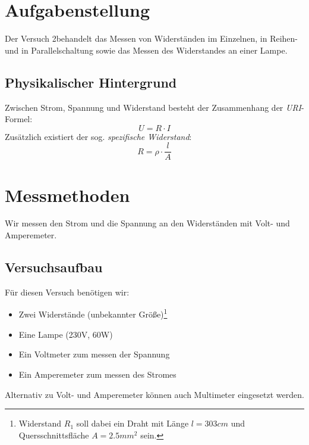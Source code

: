 \documentclass[10pt,a4paper]{article}
\newcommand{\vnr}{2}
\begin{document}
\newpage

\tableofcontents

\vspace{10pt}

\section{Aufgabenstellung}
\begin{flushleft}
Der Versuch \vnr behandelt das Messen von Widerständen im Einzelnen, in Reihen- und in Parallelschaltung sowie das Messen des Widerstandes an einer Lampe.
\end{flushleft}

\subsection{Physikalischer Hintergrund}
\begin{flushleft}
Zwischen Strom, Spannung und Widerstand besteht der Zusammenhang der \textit{URI}-Formel:
\begin{equation}\label{eq:uri}
U = R \cdot I
\end{equation}
Zusätzlich existiert der sog. \textit{spezifische Widerstand}:
\begin{equation}\label{eq:spezwi}
R = \rho \cdot \frac{l}{A}
\end{equation}
\end{flushleft}

\section{Messmethoden}
\begin{flushleft}
Wir messen den Strom und die Spannung an den Widerständen mit Volt- und Amperemeter.
\end{flushleft}

\subsection{Versuchsaufbau}
\begin{flushleft}
Für diesen Versuch benötigen wir:
\begin{itemize}[itemsep=0pt]
\item Zwei Widerstände (unbekannter Größe)\footnote{Widerstand $R_1$ soll dabei ein Draht mit Länge $l = 303cm$ und Quersschnittsfläche $A = 2.5mm^2$ sein.}
\item Eine Lampe (230V, 60W)
\item Ein Voltmeter zum messen der Spannung
\item Ein Amperemeter zum messen des Stromes
\end{itemize}
Alternativ zu Volt- und Amperemeter können auch Multimeter eingesetzt werden.
\end{flushleft}
\end{document}
